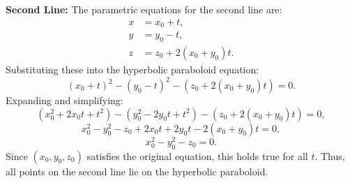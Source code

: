 \documentclass[reqno, 12pt]{amsart}
\begin{document}
\begin{itemize}
\begin{answerbox}
      \textbf{Second Line:}
      The parametric equations for the second line are:
      \[
        \begin{aligned}
          x &= x_0 + t, \\
          y &= y_0 - t, \\
          z &= z_0 + 2(x_0 + y_0)t.
        \end{aligned}
      \]
      Substituting these into the hyperbolic paraboloid equation:
      \[
        (x_0 + t)^2 - (y_0 - t)^2 - (z_0 + 2(x_0 + y_0)t) = 0.
      \]
      Expanding and simplifying:
      \[
        (x_0^2 + 2x_0t + t^2) - (y_0^2 - 2y_0t + t^2) - (z_0 + 2(x_0 + y_0)t) = 0,
      \]
      \[
        x_0^2 - y_0^2 - z_0 + 2x_0t + 2y_0t - 2(x_0 + y_0)t = 0,
      \]
      \[
        x_0^2 - y_0^2 - z_0 = 0.
      \]
      Since $(x_0, y_0, z_0)$ satisfies the original equation, this holds true for all $t$. Thus, all points on the second line lie on the hyperbolic paraboloid.
    \end{answerbox}


\end{itemize}
\end{document}
